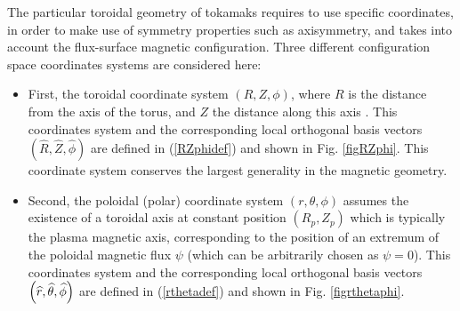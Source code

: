 The particular toroidal geometry of tokamaks requires to use specific
coordinates, in order to make use of symmetry properties such as
axisymmetry, and takes into account the flux-surface magnetic configuration. Three
different configuration space coordinates systems are considered here:

\begin{itemize}
\item  First, the toroidal coordinate system $\left( R,Z,\phi \right) $,
where $R$  is the distance from the axis of the torus, and $Z$
 the distance
along this axis . This coordinates system and the corresponding local
orthogonal basis vectors $\left( \widehat{R},\widehat{Z},\widehat{\phi }
\right) $  
 are defined in (\ref{RZphidef}) and shown in Fig. \ref{figRZphi}.
This coordinate system conserves the largest generality in the magnetic
geometry.

%

\item  Second, the poloidal (polar) coordinate system $\left( r,\theta ,\phi
\right) $ 
assumes the existence of a toroidal axis at constant position
$\left(R_{p},Z_{p}\right) $  
  which is typically the plasma magnetic axis,
corresponding to the position of an extremum of the poloidal magnetic
flux $\psi $  (which can be
arbitrarily chosen as $\psi =0$). This coordinates system and the
corresponding local orthogonal basis vectors $\left( \widehat{r},\widehat{%
\theta },\widehat{\phi }\right) $  
 are defined in (\ref{rthetadef}) and shown
in Fig. \ref{figrthetaphi}.


\end{itemize}
